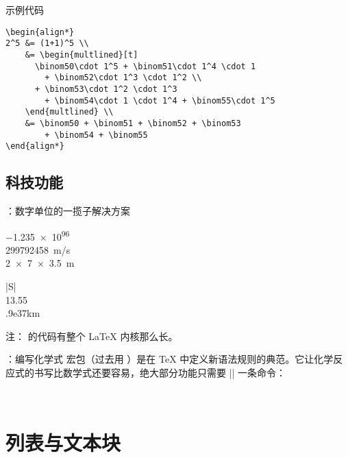 \begin{frame}[fragile]{示例代码}
\begin{Verbatim}
\begin{align*}
2^5 &= (1+1)^5 \\
    &= \begin{multlined}[t]
      \binom50\cdot 1^5 + \binom51\cdot 1^4 \cdot 1
        + \binom52\cdot 1^3 \cdot 1^2 \\
      + \binom53\cdot 1^2 \cdot 1^3
        + \binom54\cdot 1 \cdot 1^4 + \binom55\cdot 1^5
    \end{multlined} \\
    &= \binom50 + \binom51 + \binom52 + \binom53
        + \binom54 + \binom55
\end{align*}
\end{Verbatim}
\end{frame}

\subsection{科技功能}

\begin{frame}[fragile]{：数字单位的一揽子解决方案}
\begin{democode}
\num{-1.235e96} \\
\SI{299792458}{m/s} \\
\SI{2x7x3.5}{m}
\end{democode}
\pause
\begin{democode}
\begin{tabular}{|S|}\\ 13.55 \\ .9e37km \\
\hline
\end{tabular}
\end{democode}
\pause
注： 的代码有整个 \LaTeX{} 内核那么长。
\end{frame}

\begin{frame}[fragile]{：编写化学式}
 宏包（过去用 ）是在 \TeX{} 中定义新语法规则的典范。它让化学反应式的书写比数学式还要容易，绝大部分功能只需要 |\ch| 一条命令：
\begin{democode}
\\
\end{democode}
\end{frame}


\section{列表与文本块}


